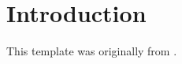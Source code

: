 \chapter{Introduction} \label{Chapter:Introduction}
This template was originally from \cite{Gunn:2001:pdflatex}.